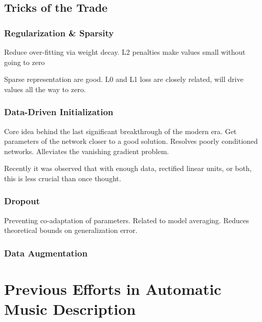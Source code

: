 \subsection{Tricks of the Trade}
\label{subsec:tricks}

\subsubsection{Regularization \& Sparsity}
Reduce over-fitting via weight decay.
L2 penalties make values small without going to zero

Sparse representation are good.
L0 and L1 loss are closely related, will drive values all the way to zero.

\subsubsection{Data-Driven Initialization}

Core idea behind the last significant breakthrough of the modern era.
Get parameters of the network closer to a good solution.
Resolves poorly conditioned networks.
Alleviates the vanishing gradient problem.

Recently it was observed that with enough data, rectified linear units, or both, this is less crucial than once thought.


\subsubsection{Dropout}
Preventing co-adaptation of parameters.
Related to model averaging.
Reduces theoretical bounds on generalization error.


\subsubsection{Data Augmentation}




\section{Previous Efforts in Automatic Music Description}

